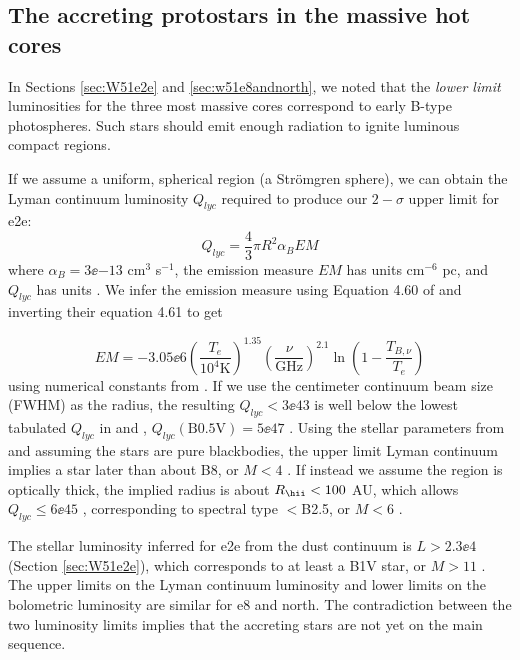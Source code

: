 \documentclass[twocolumn]{aastex61}
\begin{document}
\subsection{The accreting protostars in the massive hot cores}
\label{sec:stellarproperties}
In Sections \ref{sec:W51e2e} and \ref{sec:w51e8andnorth}, we noted that the
\emph{lower limit} luminosities for the three most massive cores correspond to
early B-type photospheres.  Such stars should emit enough radiation to ignite
luminous compact \hii regions. %

If we assume a uniform, spherical \hii region (a Strömgren sphere), we can
obtain the Lyman continuum luminosity $Q_{lyc}$ required to produce our
$2-\sigma$ upper limit for e2e:
\begin{equation}
    Q_{lyc} = \frac{4}{3} \pi R^2 \alpha_B EM
\end{equation}
where $\alpha_B = 3\ee{-13}$ cm$^{3}$ s$^{-1}$, the emission measure $EM$ has
units cm$^{-6}$ pc, and $Q_{lyc}$ has units \pers.  We infer the emission measure
using Equation 4.60 of \citet{Condon2007a} and inverting their equation 4.61 to
get

\begin{equation}
EM = -3.05\ee{6} 
\left(\frac{T_e}{10^4\mathrm{K}}\right)^{1.35}
\left(\frac{\nu}{\mathrm{GHz}}\right)^{2.1}
\ln\left(1-\frac{T_{B,\nu}}{T_e}\right)
\end{equation}
using numerical constants
from \citet{Mezger1967a}.  If we use the centimeter
continuum beam size (FWHM) as the radius, the resulting $Q_{lyc}<3\ee{43}$ \pers 
is well below the lowest tabulated $Q_{lyc}$ in \citet{Vacca1996a} and
\citet{Sternberg2003a},
$Q_{lyc}(\mathrm{B0.5V}) = 5\ee{47}$ \pers.  Using the stellar parameters from
\citet{Pecaut2013a} and assuming the stars are pure blackbodies, the upper
limit Lyman continuum implies a star later than about B8, or $M<4$ \msun.  If
instead we assume the \hii region is optically thick, the implied radius is
about $R_{\scriptsize{\hii}}<100$ AU, which allows $Q_{lyc}\leq6\ee{45}$ \pers,
corresponding to spectral type $<$B2.5, or $M<6$ \msun.  


The stellar luminosity inferred for e2e from the dust continuum is
$L>2.3\ee{4}$ \lsun (Section \ref{sec:W51e2e}), which corresponds to at least a
B1V star, or $M>11$ \msun.  The upper limits on the Lyman continuum luminosity
and lower limits on the bolometric luminosity are similar for e8 and north.
The contradiction between the two luminosity limits implies that the accreting
stars are not yet on the main sequence.
\end{document}
